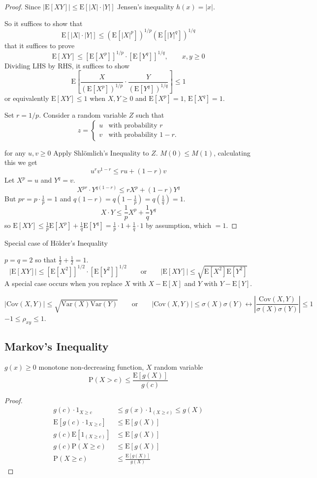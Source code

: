 \documentclass[english,12pt]{article}
\theoremstyle{plain}
\theoremstyle{definition}
\theoremstyle{definition} %
\newcommand{\prf}[1]{\begin{proof} #1 \end{proof} }
\newcommand{\ex}[1]{\mbox{E} \left[ #1 \right]}
\newcommand{\var}[1]{\mbox{Var} \left( #1 \right)}
\newcommand{\cov}[1]{\mbox{Cov} \left( #1 \right)}
\begin{document}
\prf{
Since $|\ex{XY}| \leq \ex{|X| \cdot |Y|}$ Jensen's inequality $h(x) = |x|$.

So it suffices to show that
\[ \ex{ |X| \cdot |Y| } \leq ( \ex{|X|^p} )^{1/p} ( \ex{|Y|^q} )^{1/q} \]
that it suffices to prove
\[ \ex{XY} \leq [\ex{X^p}]^{1/p} \cdot [\ex{Y^q}]^{1/q}, \qquad x, y \geq 0 \]
Dividing LHS by RHS, it suffices to show
\[ \ex{ \frac{X}{(\ex{X^p})^{1/p}} \cdot \frac{Y}{(\ex{Y^q})^{1/q}}} \leq 1 \]
or equivalently $\ex{XY} \leq 1$ when $X,Y \geq 0$ and $\ex{X^p} = 1$, $\ex{X^q} = 1$.

Set $r = 1/p$. Consider a random variable $Z$ such that
\[ z = \begin{cases}
u & \text{with probability } r \\ v & \text{with probability } 1-r. \end{cases} \]

for any $u,v \geq 0$ Apply Shl\"{o}mlich's Inequality to $Z$. $M( 0 ) \leq M( 1 )$, calculating this we get
\[ u^r v^{1-r} \leq ru + (1-r) v \]
Let $X^p = u$ and $Y^q = v$.
\[ X^{pr} \cdot Y^{q(1-r)} \leq rX^p + (1-r)Y^q \]
But $pr = p \cdot \frac{1}{p} = 1$ and $q(1-r) = q(1-\frac{1}{p}) = q(\frac{1}{q}) = 1$.
\[ X \cdot Y \leq \frac{1}{p} X^p + \frac{1}{q} Y^q \]
so $\ex{XY} \leq \frac{1}{p} \ex{X^p} + \frac{1}{q} \ex{Y^q} = \frac{1}{p} \cdot 1 + \frac{1}{q} \cdot 1$ by assumption, which $= 1$.
}


Special case of H\"{o}lder's Inequality

$p=q=2$ so that $\frac{1}{2} + \frac{1}{2} = 1$.
\[ |\ex{XY}| \leq [\ex{X^2}]^{1/2} \cdot [\ex{Y^2}]^{1/2} \qquad\text{or}\qquad |\ex{XY}| \leq \sqrt{ \ex{X^2} \ex{Y^2} }\]
A special case occurs when you replace $X$ with $X - \ex{X}$ and $Y$ with $Y - \ex{Y}$.

\[ |\cov{X,Y}| \leq \sqrt{\var{X} \var{Y}} \qquad \text{or} \qquad |\cov{X,Y}| \leq \sigma(X) \sigma(Y) \leftrightarrow \left| \frac{\cov{X,Y}}{\sigma(X) \sigma(Y)} \right| \leq 1 \]
$-1 \leq \rho_{xy} \leq 1$.

\subsection{Markov's Inequality}
$g(x) \geq 0$ monotone non-decreasing function, $X$ random variable
\[ \text{P}(X > c) \leq \frac{\ex{g(X)}}{g(c )} \]

\prf{
\begin{align*}
g( c ) \cdot 1_{X \ge c} &\le g(x) \cdot 1_{(X \ge c)} \le g(X)\\
\ex{g(c ) \cdot 1_{X \ge c}} &\le \ex{g(X)}\\
g(c)\ex{1_{(X\ge c)}}&\le\ex{g(X)}\\
g(c)\text{P}(X\ge c)&\le\ex{g(X)}\\
\text{P}(X\ge c)&\le\frac{\ex{g(X)}}{g(X)}
\end{align*}
}
\end{document}
